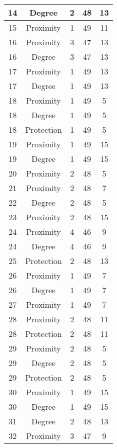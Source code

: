 \documentclass[results.tex]{subfiles}
\begin{document}
\begin{center}
\begin{tabular}{| c || c | c | c | c |}
    \hline
    14 & Degree & 2 & 48 & 13 \\ 
    \hline
    15 & Proximity & 1 & 49 & 11 \\ 
    \hline
    16 & Proximity & 3 & 47 & 13 \\ 
    \hline
    16 & Degree & 3 & 47 & 13 \\ 
    \hline
    17 & Proximity & 1 & 49 & 13 \\ 
    \hline
    17 & Degree & 1 & 49 & 13 \\ 
    \hline
    18 & Proximity & 1 & 49 & 5 \\ 
    \hline
    18 & Degree & 1 & 49 & 5 \\ 
    \hline
    18 & Protection & 1 & 49 & 5 \\ 
    \hline
    19 & Proximity & 1 & 49 & 15 \\ 
    \hline
    19 & Degree & 1 & 49 & 15 \\ 
    \hline
    20 & Proximity & 2 & 48 & 5 \\ 
    \hline
    21 & Proximity & 2 & 48 & 7 \\ 
    \hline
    22 & Degree & 2 & 48 & 5 \\ 
    \hline
    23 & Proximity & 2 & 48 & 15 \\ 
    \hline
    24 & Proximity & 4 & 46 & 9 \\ 
    \hline
    24 & Degree & 4 & 46 & 9 \\ 
    \hline
    25 & Protection & 2 & 48 & 13 \\ 
    \hline
    26 & Proximity & 1 & 49 & 7 \\ 
    \hline
    26 & Degree & 1 & 49 & 7 \\ 
    \hline
    27 & Proximity & 1 & 49 & 7 \\ 
    \hline
    28 & Proximity & 2 & 48 & 11 \\ 
    \hline
    28 & Protection & 2 & 48 & 11 \\ 
    \hline
    29 & Proximity & 2 & 48 & 5 \\ 
    \hline
    29 & Degree & 2 & 48 & 5 \\ 
    \hline
    29 & Protection & 2 & 48 & 5 \\ 
    \hline
    30 & Proximity & 1 & 49 & 15 \\ 
    \hline
    30 & Degree & 1 & 49 & 15 \\ 
    \hline
    31 & Degree & 2 & 48 & 13 \\ 
    \hline
    32 & Proximity & 3 & 47 & 9 \\ 
    \hline

\end{tabular}
\end{center}
\end{document}
